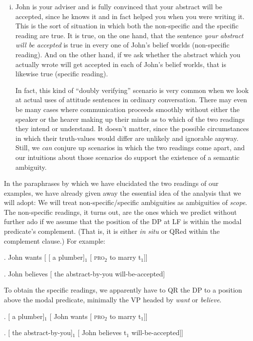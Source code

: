 \begin{enumerate}[(i)]
	\item John is your adviser and is fully convinced that your abstract will be accepted, since he knows it and in fact helped you when you were writing it. This is the sort of situation in which both the non-specific and the specific reading are true. It is true, on the one hand, that the sentence \emph{your abstract will be accepted} is true in every one of John's belief worlds (non-specific reading). And on the other hand, if we ask whether the abstract which you actually wrote will get accepted in each of John's belief worlds, that is likewise true (specific reading).
	
	In fact, this kind of ``doubly verifying'' scenario is very common when we look at actual uses of attitude sentences in ordinary conversation. There may even be many cases where communication proceeds smoothly without either the speaker or the hearer making up their minds as to which of the two readings they intend or understand. It doesn't matter, since the possible circumstances in which their truth-values would differ are unlikely and ignorable anyway. Still, we \emph{can} conjure up scenarios in which the two readings come apart, and our intuitions about those scenarios do support the existence of a semantic ambiguity.
\end{enumerate}

In the paraphrases by which we have elucidated the two readings of our examples, we have already given away the essential idea of the analysis that we will adopt: We will treat non-specific/specific ambiguities as ambiguities of \emph{scope}. The non-specific readings, it turns out, are the ones which we predict without further ado if we assume that the position of the DP at LF is within the modal predicate's complement. (That is, it is either \emph{in situ} or QRed within the complement clause.) For example:

\exi. \label{first} John wants [ [ a plumber]$_1$ [ \textsc{pro}$_2$ to marry t$_1$]]

\exi. John believes [ the abstract-by-you will-be-accepted]

To obtain the specific readings, we apparently have to QR the DP to a position above the modal predicate, minimally the VP headed by \emph{want} or \emph{believe}.

\exi. [ a plumber]$_1$ [ John wants [ \textsc{pro}$_2$ to marry t$_1$]]

\exi. [ the abstract-by-you]$_1$ [ John believes t$_1$ will-be-accepted]]

